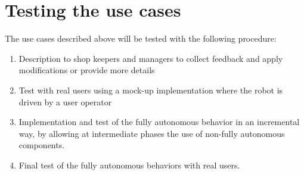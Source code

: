 \section{Testing the use cases}

The use cases described above will be tested with the following procedure:
\begin{enumerate}
\item Description to shop keepers and managers to collect feedback and apply modifications or provide more details
\item Test with real users using a mock-up implementation where the robot is driven by a user operator
\item Implementation and test of the fully autonomous behavior in an incremental way, by allowing at intermediate phases the use of non-fully autonomous components.
\item Final test of the fully autonomous behaviors with real users.
\end{enumerate}


